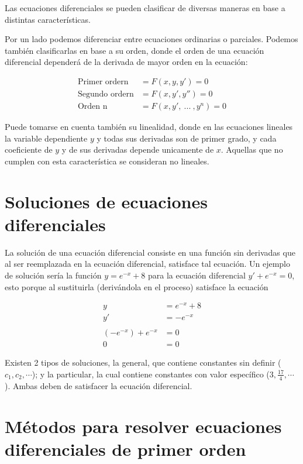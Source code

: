 
Las ecuaciones diferenciales se pueden clasificar de diversas maneras en base a distintas características. 

Por un lado podemos diferenciar entre ecuaciones ordinarias o parciales. Podemos también clasificarlas en base a su orden, donde el orden de una ecuación diferencial dependerá de la derivada de mayor orden en la ecuación:

\begin{align*}
\text{Primer ordern} &= F(x,y,y')=0
\\
\text{Segundo ordern} &= F(x,y',y'')=0
\\
\text{Orden n} &= F(x,y', \ ... \ , y^{n})=0
\end{align*}

Puede tomarse en cuenta también su linealidad, donde en las ecuaciones lineales la variable dependiente $y$ y todas sus derivadas son de primer grado, y cada coeficiente de $y$ y de sus derivadas depende unicamente de $x$. Aquellas que no cumplen con esta característica se consideran no lineales.

\section{Soluciones de ecuaciones diferenciales}

La solución de una ecuación diferencial consiste en una función sin derivadas que al ser reemplazada en la ecuación diferencial, satisface tal ecuación.
Un ejemplo de solución sería la función $y=e^{-x}+8$  para la ecuación diferencial $y'+e^{-x}=0$, esto porque al sustituirla (derivándola en el proceso) satisface la ecuación

\begin{align*}
    y &= e^{-x}+8
    \\
    y' &= -e^{-x}
    \\
    \\
    (-e^{-x})+e^{-x} &= 0
    \\
    0 &= 0
\end{align*}

Existen 2 tipos de soluciones, la general, que contiene constantes sin definir ($c_{1}, c_{2}, \cdots$); y la particular, la cual contiene constantes con valor específico ($3, \frac{17}{4}, \cdots$). Ambas  deben de satisfacer la ecuación diferencial.

\section{Métodos para resolver ecuaciones diferenciales de primer orden}

